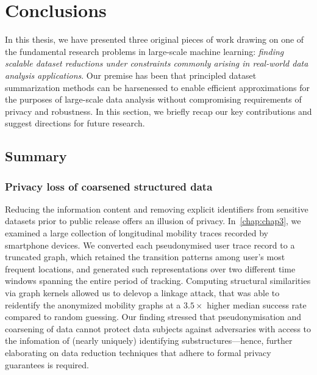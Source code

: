 \chapter{Conclusions}
\label{chap:chap6}
\renewcommand*{\MyPath}{../Chapter6}%

In this thesis, we have presented three original pieces of work drawing on one of the fundamental research problems in large-scale machine learning: \emph{finding scalable dataset reductions under constraints commonly arising in real-world data analysis applications}. Our premise has been that principled dataset summarization methods can be harsenessed to enable efficient approximations for the purposes of large-scale data analysis without compromising requirements of privacy and robustness. In this section, we briefly recap our key contributions and suggest directions for future research.

\section{Summary}
\label{sec:summary}


\subsection{Privacy loss of coarsened structured data}
\label{subsec:ch3-summary}
Reducing the information content and removing explicit identifiers from sensitive datasets prior to public release offers an illusion of privacy. In~\cref{chap:chap3}, we examined a large collection of longitudinal mobility traces recorded by smartphone devices. We converted each pseudonymised user trace record to a truncated graph, which retained the transition patterns among user's most frequent locations, and generated such representations over two different time windows spanning the entire period of tracking. Computing structural similarities via graph kernels allowed us to delevop a linkage attack, that was able to reidentify the anonymized mobility graphs at a $3.5\times$ higher median success rate compared to random guessing. Our finding stressed that pseudonymisation and coarsening of data cannot protect data subjects against adversaries with access to the infomation of (nearly uniquely) identifying substructures---hence, further elaborating on data reduction techniques that adhere to formal privacy guarantees is required.

